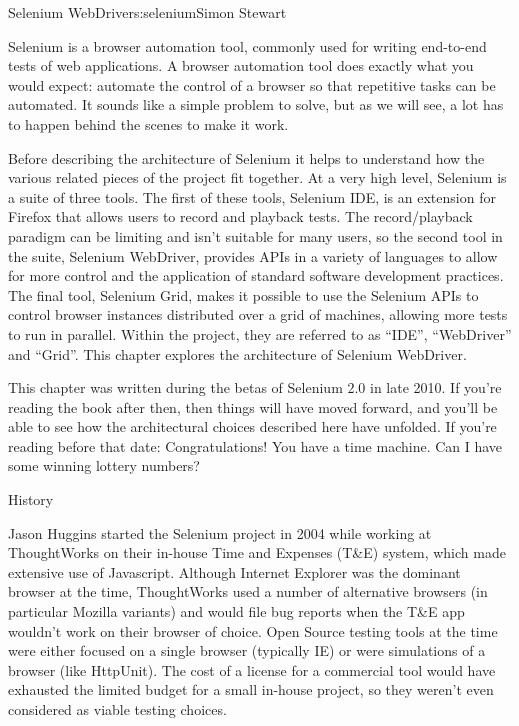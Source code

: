 \begin{aosachapter}{Selenium WebDriver}{s:selenium}{Simon Stewart}

Selenium is a browser automation tool, commonly used for writing
end-to-end tests of web applications. A browser automation tool
does exactly what you would expect: automate the control of a
browser so that repetitive tasks can be automated. It sounds like
a simple problem to solve, but as we will see, a lot has to happen
behind the scenes to make it work.

Before describing the architecture of Selenium it helps to understand
how the various related pieces of the
project fit together. At a very high level, Selenium is a suite of
three tools. The first of these tools, Selenium
IDE, is an extension for Firefox that allows users to record and
playback tests. The record/playback paradigm can be limiting and isn't
suitable for many users, so the second tool in the suite, Selenium
WebDriver, provides APIs in a variety of languages to allow for more
control and the application of standard software development
practices. The final tool, Selenium Grid, makes it possible to use the
Selenium APIs to control browser instances distributed over a grid of
machines, allowing more tests to run in parallel. Within the project,
they are referred to as ``IDE'', ``WebDriver'' and ``Grid''. This
chapter explores the architecture of Selenium WebDriver.

This chapter was written during the betas of Selenium 2.0 in late
2010. If you're reading the book after then, then things will have
moved forward, and you'll be able to see how the architectural choices
described here have unfolded. If you're reading before that date:
Congratulations! You have a time machine. Can I have some winning
lottery numbers?

\begin{aosasect1}{History}

Jason Huggins started the Selenium project in 2004 while working at
ThoughtWorks on their in-house Time and Expenses (T\&E) system, which
made extensive use of Javascript. Although Internet Explorer was the
dominant browser at the time, ThoughtWorks used a number of
alternative browsers (in particular Mozilla variants) and would file
bug reports when the T\&E app wouldn't work on their browser of
choice. Open Source testing tools at the time were either focused on a
single browser (typically IE) or were simulations of a browser (like
HttpUnit).  The cost of a license for a commercial tool would have
exhausted the limited budget for a small in-house project, so they
weren't even considered as viable testing choices.


\end{aosasect1}
\end{aosachapter}
